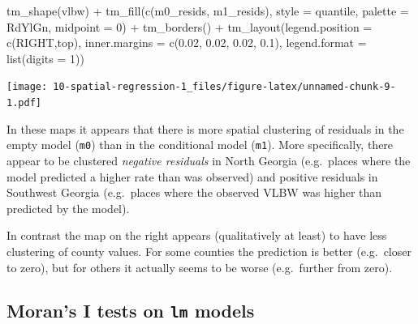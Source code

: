 \documentclass[
]{book}
\newenvironment{Shaded}{\begin{snugshade}}{\end{snugshade}}
\newcommand{\AttributeTok}[1]{\textcolor[rgb]{0.77,0.63,0.00}{#1}}
\newcommand{\DecValTok}[1]{\textcolor[rgb]{0.00,0.00,0.81}{#1}}
\newcommand{\FloatTok}[1]{\textcolor[rgb]{0.00,0.00,0.81}{#1}}
\newcommand{\FunctionTok}[1]{\textcolor[rgb]{0.00,0.00,0.00}{#1}}
\newcommand{\NormalTok}[1]{#1}
\newcommand{\SpecialCharTok}[1]{\textcolor[rgb]{0.00,0.00,0.00}{#1}}
\newcommand{\StringTok}[1]{\textcolor[rgb]{0.31,0.60,0.02}{#1}}
\begin{document}
\begin{Shaded}
\begin{Highlighting}[]
\FunctionTok{tm\_shape}\NormalTok{(vlbw) }\SpecialCharTok{+}
  \FunctionTok{tm\_fill}\NormalTok{(}\FunctionTok{c}\NormalTok{(}\StringTok{\textquotesingle{}m0\_resids\textquotesingle{}}\NormalTok{, }\StringTok{\textquotesingle{}m1\_resids\textquotesingle{}}\NormalTok{),}
          \AttributeTok{style =} \StringTok{\textquotesingle{}quantile\textquotesingle{}}\NormalTok{,}
          \AttributeTok{palette =} \StringTok{\textquotesingle{}RdYlGn\textquotesingle{}}\NormalTok{,}
          \AttributeTok{midpoint =} \DecValTok{0}\NormalTok{) }\SpecialCharTok{+}
  \FunctionTok{tm\_borders}\NormalTok{()  }\SpecialCharTok{+}
  \FunctionTok{tm\_layout}\NormalTok{(}\AttributeTok{legend.position =} \FunctionTok{c}\NormalTok{(}\StringTok{\textquotesingle{}RIGHT\textquotesingle{}}\NormalTok{,}\StringTok{\textquotesingle{}top\textquotesingle{}}\NormalTok{),}
            \AttributeTok{inner.margins =} \FunctionTok{c}\NormalTok{(}\FloatTok{0.02}\NormalTok{, }\FloatTok{0.02}\NormalTok{, }\FloatTok{0.02}\NormalTok{, }\FloatTok{0.1}\NormalTok{),}
            \AttributeTok{legend.format =} \FunctionTok{list}\NormalTok{(}\AttributeTok{digits =} \DecValTok{1}\NormalTok{))}
\end{Highlighting}
\end{Shaded}

\texttt{[image: 10-spatial-regression-1\_files/figure-latex/unnamed-chunk-9-1.pdf]}

In these maps it appears that there is more spatial clustering of residuals in the empty model (\texttt{m0}) than in the conditional model (\texttt{m1}). More specifically, there appear to be clustered \emph{negative residuals} in North Georgia (e.g.~places where the model predicted a higher rate than was observed) and positive residuals in Southwest Georgia (e.g.~places where the observed VLBW was higher than predicted by the model).

In contrast the map on the right appears (qualitatively at least) to have less clustering of county values. For some counties the prediction is better (e.g.~closer to zero), but for others it actually seems to be worse (e.g.~further from zero).

\hypertarget{morans-i-tests-on-lm-models}{%
\subsection{\texorpdfstring{Moran's I tests on \texttt{lm} models}{Moran's I tests on lm models}}\label{morans-i-tests-on-lm-models}}
\end{document}
